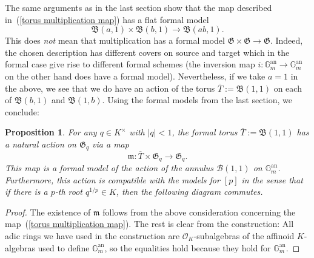 \documentclass[10pt,oneside]{amsart}
\newtheorem{proposition}[theorem]{Proposition}
\theoremstyle{definition}
\begin{document}
	The same arguments as in the last section show that the map described in~(\ref{torus multiplication map}) has a flat formal model
	\[\mathfrak B(a,1)\times \mathfrak B(b,1)\rightarrow \mathfrak B(ab,1).\]
	This does \textit{not} mean that multiplication has a formal model $\mathfrak G\times \mathfrak G\rightarrow \mathfrak G$. Indeed, the chosen description has different covers on source and target which in the formal case give rise to different formal schemes (the inversion map $i:\mathbb G_m^{\operatorname{an}}\rightarrow \mathbb G_m^{\operatorname{an}}$ on the other hand does have a formal model). Nevertheless, if we take $a=1$ in the above, we see that we do have an action of the torus $\overline{T}:=\mathfrak B(1,1)$ on each of $\mathfrak B(b,1)$ and $\mathfrak B(1,b)$. Using the formal models from the last section, we conclude:
	
	\begin{proposition}\label{action on formal model of torus}
		For any $q\in K^\times$ with $|q|<1$, the formal torus $\overline{T}:=\mathfrak B(1,1)$ has a natural action on $\mathfrak G_q$ via a map
		\[\mathfrak m:\overline{T}\times \mathfrak G_q\rightarrow \mathfrak G_q.\]
		This map is a formal model of the action of the annulus $\mathcal B(1,1)$ on $\mathbb G_m^{\operatorname{an}}$. Furthermore, this action is compatible with the models for $[p]$ in the sense that if there is a $p$-th root $q^{1/p}\in K$, then the following diagram commutes.
		\begin{center}
		\end{center}
	\end{proposition} 
	\begin{proof}
		The existence of $\mathfrak m$ follows from the above consideration concerning the map~(\ref{torus multiplication map}). The rest is clear from the construction: All adic rings we have used in the construction are $\mathcal O_K$-subalgebras of the affinoid $K$-algebras used to define $\mathbb G_m^{\operatorname{an}}$, so the equalities hold because they hold for $\mathbb G_m^{\operatorname{an}}$.
	\end{proof}
	
\end{document}
